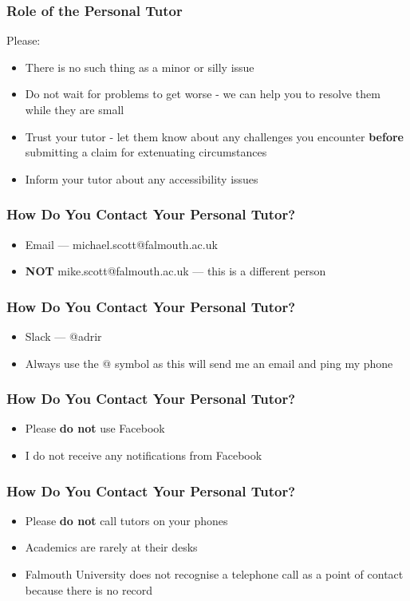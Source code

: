 \begin{frame}
	\frametitle{Role of the Personal Tutor}	
	
	Please:
	
	\begin{itemize}
		\item There is no such thing as a minor or silly issue
		\item Do not wait for problems to get worse - we can help you to resolve them while they are small
		\item Trust your tutor - let them know about any challenges you encounter
		         \textbf{before} submitting a claim for extenuating circumstances
		\item Inform your tutor about any accessibility issues
	\end{itemize}
\end{frame}

\begin{frame}
	\frametitle{How Do You Contact Your Personal Tutor?}	
	\begin{itemize}
		\item Email --- michael.scott@falmouth.ac.uk \pause
		\item \textbf{NOT} mike.scott@falmouth.ac.uk --- this is a different person
	\end{itemize}
\end{frame}

\begin{frame}
	\frametitle{How Do You Contact Your Personal Tutor?}	
	\begin{itemize}
		\item Slack --- @adrir \pause
		\item Always use the @ symbol as this will send me an email and ping my phone
	\end{itemize}
\end{frame}

\begin{frame}
	\frametitle{How Do You Contact Your Personal Tutor?}	
	\begin{itemize}
		\item Please \textbf{do not} use Facebook
		\item I do not receive any notifications from Facebook
	\end{itemize}
\end{frame}

\begin{frame}
	\frametitle{How Do You Contact Your Personal Tutor?}	
	\begin{itemize}
		\item Please \textbf{do not} call tutors on your phones
		\item Academics are rarely at their desks
		\item Falmouth University does not recognise a telephone call as a point of contact because there is no record
	\end{itemize}
\end{frame}

